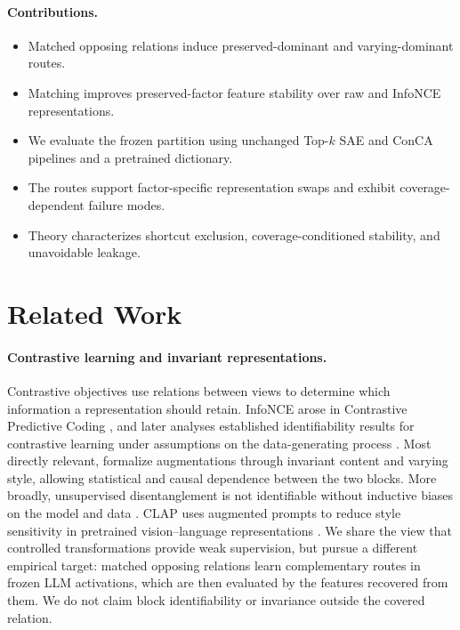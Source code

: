 \documentclass[11pt]{article}
\begin{document}
\paragraph{Contributions.}
\begin{itemize}
\item Matched opposing relations induce preserved-dominant and varying-dominant routes.
\item Matching improves preserved-factor feature stability over raw and InfoNCE representations.
\item We evaluate the frozen partition using unchanged Top-$k$ SAE and ConCA pipelines and a pretrained dictionary.
\item The routes support factor-specific representation swaps and exhibit coverage-dependent failure modes.
\item Theory characterizes shortcut exclusion, coverage-conditioned stability, and unavoidable leakage.
\end{itemize}

\section{Related Work}
\paragraph{Contrastive learning and invariant representations.}
Contrastive objectives use relations between views to determine which information a representation should retain. InfoNCE arose in Contrastive Predictive Coding \citep{oord2018cpc}, and later analyses established identifiability results for contrastive learning under assumptions on the data-generating process \citep{zimmermann2021contrastive}. Most directly relevant, \citet{vonkugelgen2021selfsupervised} formalize augmentations through invariant content and varying style, allowing statistical and causal dependence between the two blocks. More broadly, unsupervised disentanglement is not identifiable without inductive biases on the model and data \citep{locatello2019disentanglement}. CLAP uses augmented prompts to reduce style sensitivity in pretrained vision--language representations \citep{cai2023clap}. We share the view that controlled transformations provide weak supervision, but pursue a different empirical target: matched opposing relations learn complementary routes in frozen LLM activations, which are then evaluated by the features recovered from them. We do not claim block identifiability or invariance outside the covered relation.
\end{document}
